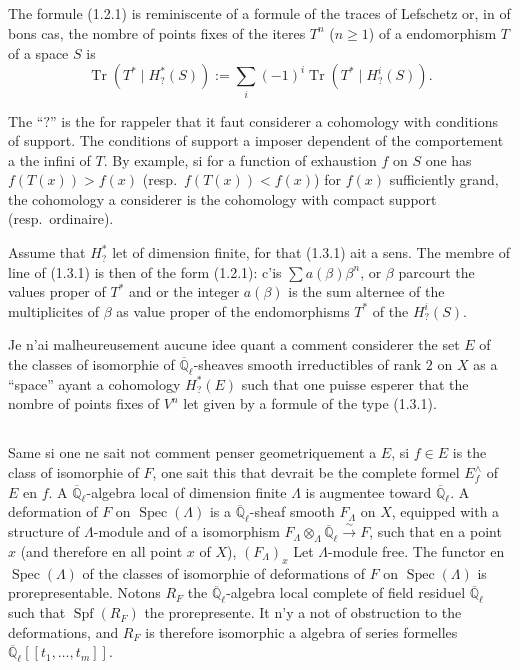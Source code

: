 \documentclass[11pt,a4paper]{article}
\theoremstyle{plain}
\theoremstyle{definition}
\DeclareMathOperator{\Spec}{Spec}
\DeclareMathOperator{\Specf}{Spf}
\DeclareMathOperator{\Tr}{Tr}
\newcommand{\Ql}{\overline{\mathbb{Q}}_\ell}
\begin{document}
\subsection{}
The formule (1.2.1) is reminiscente of a formule of the traces of Lefschetz or, in of bons cas, the nombre of points fixes of the iteres $T^n$ ($n \geq 1$) of a endomorphism $T$ of a space $S$ is
\begin{equation}
\Tr(T^* \mid H^*_?(S)) := \sum_i (-1)^i \Tr(T^* \mid H^i_?(S)).
\tag{1.3.1}
\end{equation}

The ``$?$'' is the for rappeler that it faut considerer a cohomology with conditions of support. The conditions of support a imposer dependent of the comportement a the infini of $T$. By example, si for a function of exhaustion $f$ on $S$ one has $f(T(x)) > f(x)$ (resp.\ $f(T(x)) < f(x)$) for $f(x)$ sufficiently grand, the cohomology a considerer is the cohomology with compact support (resp.\ ordinaire).

Assume that $H^*_?$ let of dimension finite, for that (1.3.1) ait a sens. The membre of line of (1.3.1) is then of the form (1.2.1): c'is $\sum a(\beta)\beta^n$, or $\beta$ parcourt the values proper of $T^*$ and or the integer $a(\beta)$ is the sum alternee of the multiplicites of $\beta$ as value proper of the endomorphisms $T^*$ of the $H^i_?(S)$.

Je n'ai malheureusement aucune idee quant a comment considerer the set $E$ of the classes of isomorphie of $\Ql$-sheaves smooth irreductibles of rank $2$ on $X$ as a ``space'' ayant a cohomology $H^*_?(E)$ such that one puisse esperer that the nombre of points fixes of $V^n$ let given by a formule of the type (1.3.1).

\subsection{}
Same si one ne sait not comment penser geometriquement a $E$, si $f \in E$ is the class of isomorphie of $F$, one sait this that devrait be the complete formel $E^\wedge_f$ of $E$ en $f$. A $\Ql$-algebra local of dimension finite $\Lambda$ is augmentee toward $\Ql$. A deformation of $F$ on $\Spec(\Lambda)$ is a $\Ql$-sheaf smooth $F_\Lambda$ on $X$, equipped with a structure of $\Lambda$-module and of a isomorphism $F_\Lambda \otimes_\Lambda \Ql \xrightarrow{\sim} F$, such that en a point $x$ (and therefore en all point $x$ of $X$), $(F_\Lambda)_x$ Let $\Lambda$-module free. The functor en $\Spec(\Lambda)$ of the classes of isomorphie of deformations of $F$ on $\Spec(\Lambda)$ is prorepresentable. Notons $R_F$ the $\Ql$-algebra local complete of field residuel $\Ql$ such that $\Specf(R_F)$ the prorepresente. It n'y a not of obstruction to the deformations, and $R_F$ is therefore isomorphic a algebra of series formelles $\Ql[[t_1,\ldots,t_m]]$.
\end{document}

